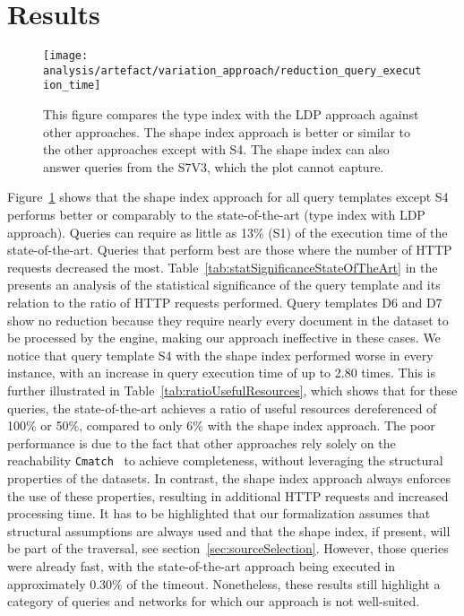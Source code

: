 \section{Results}

\begin{figure}[h]
    \centering
    \texttt{[image: analysis/artefact/variation\_approach/reduction\_query\_execution\_time]}
    \caption{
        This figure compares the type index with the LDP approach against other approaches.
        The shape index approach is better or similar to the other approaches except with S4.
        The shape index can also answer queries from the S7V3, which the plot cannot capture.
    }
    \label{fig:compApproach}
\end{figure}


Figure~\ref{fig:compApproach} shows that the shape index approach for all query templates except S4 performs better or comparably to the state-of-the-art (type index with LDP approach).
Queries can require as little as 13\% (S1) of the execution time of the state-of-the-art.
Queries that perform best are those where the number of HTTP requests decreased the most.
Table~\ref{tab:statSignificanceStateOfTheArt} in the  presents an analysis of the statistical significance of the query template and its relation to the ratio of HTTP requests performed.
Query templates D6 and D7 show no reduction because they require nearly every document in the dataset to be processed by the engine, making our approach ineffective in these cases.
We notice that query template S4 with the shape index performed worse in every instance, with an increase in query execution time of up to 2.80 times.
This is further illustrated in Table~\ref{tab:ratioUsefulResources}, which shows that for these queries, the state-of-the-art achieves a ratio of useful resources dereferenced of 100\% or 50\%, compared to only 6\% with the shape index approach.
The poor performance is due to the fact that other approaches rely solely on the reachability \texttt{Cmatch}~\cite{hartig2016walking} to achieve completeness, without leveraging the structural properties of the datasets.
In contrast, the shape index approach always enforces the use of these properties, resulting in additional HTTP requests and increased processing time.
It has to be highlighted that our formalization assumes that structural assumptions are always used and that the shape index, if present, will be part of the traversal, see section~\ref{sec:sourceSelection}.
However, those queries were already fast, with the state-of-the-art approach being executed in approximately 0.30\% of the timeout.
Nonetheless, these results still highlight a category of queries and networks for which our approach is not well-suited.


